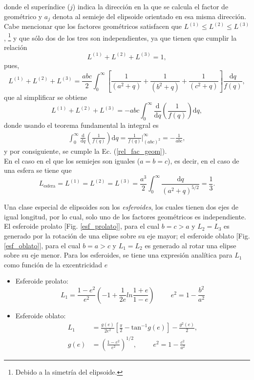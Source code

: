 donde el superíndice ($j$) indica la dirección en la que se calcula el factor de geométrico y $a_j$ denota al semieje del elipsoide orientado en esa misma dirección. Cabe mencionar que los factores geométricos  satisfacen que $L^{(1)}\leq L^{(2)}\leq L^{(3)}$, \footnote{Debido a la simetría del elipsoide.} y que sólo dos de los tres son independientes, ya que tienen que cumplir la relación 
\begin{equation}
    L^{(1)}+L^{(2)}+L^{(3)}=1,
    \label{rel_fac_geom}
\end{equation}
pues, 
\begin{equation*}
	L^{(1)}+L^{(2)}+L^{(3)}=\frac{abc}{2}\int_0^{\infty}\left[\frac{1}{(a^2+q)}+\frac{1}{(b^2+q)}+\frac{1}{(c^2+q)}\right]\frac{\text{d}q}{f(q)},
\end{equation*}
que al simplificar se obtiene
$$L^{(1)}+L^{(2)}+L^{(3)}=-abc\int_0^{\infty}\frac{\text{d}}{\text{d}q}\left(\frac{1}{f(q)}\right)\text{d}q,$$
donde usando el teorema fundamental la integral es
\begin{align*}
	\int_0^{\infty}\frac{\text{d}}{\text{d}q}\left(\frac{1}{f(q)}\right)\text{d}q=\frac{1}{f(q)}\Big|_{(abc)^2}^{\infty}=-\frac{1}{abc},
\end{align*}
y por consiguiente, se cumple la Ec. (\ref{rel_fac_geom}).\\

\noindent En el caso en el que los semiejes son iguales ($a=b=c$), es decir, en el caso de una esfera se tiene que
\begin{equation*}
    L_{\text{esfera}}=L^{(1)}=L^{(2)}=L^{(3)}=\frac{a^3}{2}\int_0^{\infty}\frac{\text{d}q}{(a^2+q)^{5/2}}=\frac{1}{3}.
\end{equation*}

Una clase especial de elipsoides son los \textit{esferoides}, los cuales tienen dos ejes de igual longitud, por lo cual, solo uno de los factores geométricos es independiente. El esferoide prolato [Fig. \ref{esf_prolato}], para el cual $b=c>a$ y $L_2=L_3$ es generado por la rotación de una elipse sobre su eje mayor; el esferoide oblato [Fig. \ref{esf_oblato}], para el cual $b=a>c$ y $L_1=L_2$ es generado al rotar una elipse sobre su eje menor. Para los esferoides, se tiene una expresión analítica para $L_1$ como función de la excentricidad $e$ \cite{Bohren}
\begin{itemize}
    \item Esferoide prolato:
    \begin{equation}
        L_1=\frac{1-e^2}{e^2}\left(-1+\frac{1}{2e}ln\frac{1+e}{1-e}\right)\hspace{1cm}e^2=1-\frac{b^2}{a^2}
    \end{equation}
    \item Esferoide oblato:
    \begin{align}
        L_1&=\frac{g(e)}{2e^2}\left[\frac{\pi}{2}-\mbox{tan}^{-1}g(e)\right]-\frac{g^2(e)}{2},\\
        g(e)&=\left(\frac{1-e^2}{e^2}\right)^{1/2},\hspace{1cm}e^2=1-\frac{c^2}{a^2}
    \end{align}
\end{itemize}

